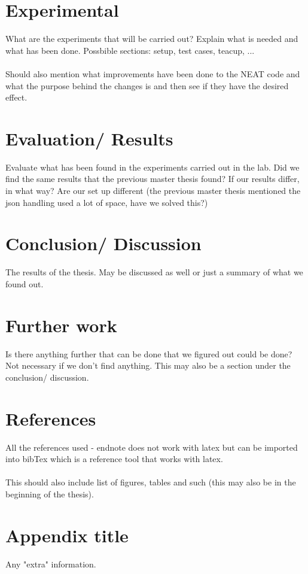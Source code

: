 \documentclass[12pt]{report}
\begin{document}
\chapter{Experimental}
What are the experiments that will be carried out? Explain what is needed and what has been done. Possbible sections: setup, test cases, teacup, ... \\
\\
Should also mention what improvements have been done to the NEAT code and what the purpose behind the changes is and then see if they have the desired effect.

\chapter{Evaluation/ Results}
Evaluate what has been found in the experiments carried out in the lab. Did we find the same results that the previous master thesis found? If our results differ, in what way? Are our set up different (the previous master thesis mentioned the json handling used a lot of space, have we solved this?)

\chapter{Conclusion/ Discussion}
The results of the thesis. May be discussed as well or just a summary of what we found out.

\chapter{Further work}
Is there anything further that can be done that we figured out could be done? Not necessary if we don't find anything. This may also be a section under the conclusion/ discussion.

\chapter{References}
All the references used - endnote does not work with latex but can be imported into bibTex which is a reference tool that works with latex.\\
\\
This should also include list of figures, tables and such (this may also be in the beginning of the thesis).

\appendix
\chapter{Appendix title}
Any "extra" information.
\end{document}
